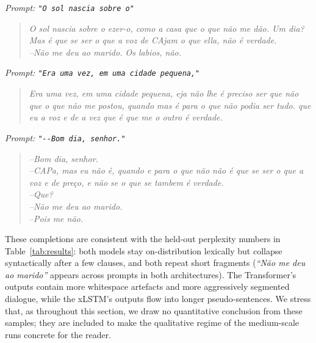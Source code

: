 \documentclass[11pt]{article}
\begin{document}
\noindent\emph{Prompt: \texttt{"O sol nascia sobre o"}}
\begin{quote}\small\itshape
O sol nascia sobre o ezer-o, como a casa que o que não me dão. Um dia?
Mas é que se ser o que a voz de CAjam o que ella, não é verdade.\\
--Não me deu ao marido. Os labios, não.
\end{quote}

\noindent\emph{Prompt: \texttt{"Era uma vez, em uma cidade pequena,"}}
\begin{quote}\small\itshape
Era uma vez, em uma cidade pequena, eja não lhe é preciso ser que não
que o que não me postou, quando mas é para o que não podia ser tudo.
que eu a voz e de a vez que é que me o outro é verdade.
\end{quote}

\noindent\emph{Prompt: \texttt{"-{}-Bom dia, senhor."}}
\begin{quote}\small\itshape
--Bom dia, senhor.\\
--CAPa, mas eu não é, quando e para o que não não é que se ser o que
a voz e de preço, e não se o que se tambem é verdade.\\
--Que?\\
--Não me deu ao marido.\\
--Pois me não.
\end{quote}

\medskip

These completions are consistent with the held-out perplexity numbers in
Table~\ref{tab:results}: both models stay on-distribution lexically but
collapse syntactically after a few clauses, and both repeat short
fragments (\emph{``Não me deu ao marido''} appears across prompts in
both architectures). The Transformer's outputs contain more whitespace
artefacts and more aggressively segmented dialogue, while the xLSTM's
outputs flow into longer pseudo-sentences. We stress that, as throughout
this section, we draw no quantitative conclusion from these samples;
they are included to make the qualitative regime of the medium-scale
runs concrete for the reader.
\end{document}

